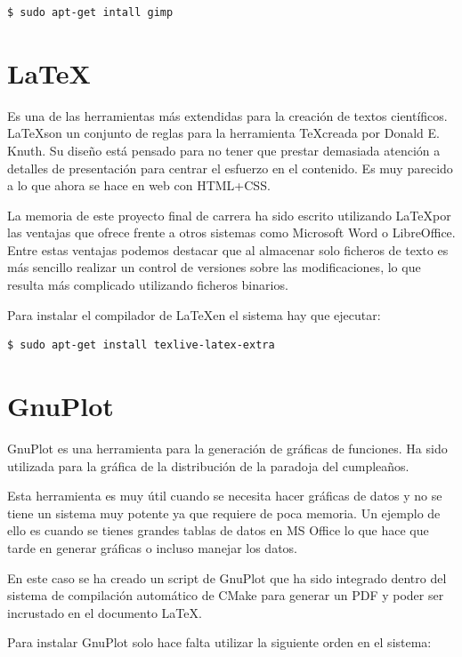 \begin{verbatim}
$ sudo apt-get intall gimp
\end{verbatim}

\section{\LaTeX}

Es una de las herramientas más extendidas para la creación de textos científicos. \LaTeX son un conjunto de reglas para la herramienta \TeX creada por Donald E. Knuth. Su diseño está pensado para no tener que prestar demasiada atención a detalles de presentación para centrar el esfuerzo en el contenido. Es muy parecido a lo que ahora se hace en web con HTML+CSS.

La memoria de este proyecto final de carrera ha sido escrito utilizando \LaTeX por las ventajas que ofrece frente a otros sistemas como Microsoft Word o LibreOffice. Entre estas ventajas podemos destacar que al almacenar solo ficheros de texto es más sencillo realizar un control de versiones sobre las modificaciones, lo que resulta más complicado utilizando ficheros binarios.

Para instalar el compilador de \LaTeX en el sistema hay que ejecutar:

\begin{verbatim}
$ sudo apt-get install texlive-latex-extra
\end{verbatim}

\section{GnuPlot}

GnuPlot es una herramienta para la generación de gráficas de funciones. Ha sido utilizada para la gráfica de la distribución de la paradoja del cumpleaños.

Esta herramienta es muy útil cuando se necesita hacer gráficas de datos y no se tiene un sistema muy potente ya que requiere de poca memoria. Un ejemplo de ello es cuando se tienes grandes tablas de datos en MS Office lo que hace que tarde en generar gráficas o incluso manejar los datos.

En este caso se ha creado un script de GnuPlot que ha sido integrado dentro del sistema de compilación automático de CMake para generar un PDF y poder ser incrustado en el documento \LaTeX.

Para instalar GnuPlot solo hace falta utilizar la siguiente orden en el sistema:

